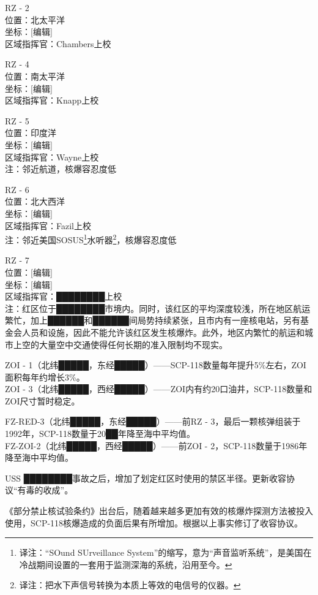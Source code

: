 RZ - 2\\
位置：北太平洋\\
坐标：{[}编辑]\\
区域指挥官：Chambers上校

RZ - 4\\
位置：南太平洋\\
坐标：{[}编辑]\\
区域指挥官：Knapp上校

RZ - 5\\
位置：印度洋\\
坐标：{[}编辑]\\
区域指挥官：Wayne上校\\
注：邻近航道，核爆容忍度低

RZ - 6\\
位置：北大西洋\\
坐标：{[}编辑]\\
区域指挥官：Fazil上校\\
注：邻近美国SOSUS\footnote{译注：“SOund SUrveillance System”的缩写，意为“声音监听系统”，是美国在冷战期间设置的一套用于监测深海的系统，沿用至今。}水听器\footnote{译注：把水下声信号转换为本质上等效的电信号的仪器。}，核爆容忍度低

RZ - 7\\
位置：{[}编辑]\\
坐标：{[}编辑]\\
区域指挥官：████████上校\\
注：红区位于████████市境内。同时，该红区的平均深度较浅，所在地区航运繁忙，加上██████和██████间局势持续紧张，且市内有一座核电站，另有基金会人员和设施，因此不能允许该红区发生核爆炸。此外，地区内繁忙的航运和城市上空的大量空中交通使得任何长期的准入限制均不现实。


ZOI - 1（北纬█████，东经█████）——SCP-118数量每年提升5\%左右，ZOI面积每年约增长3\%。\\
ZOI - 3（北纬█████，西经█████）——ZOI内有约20口油井，SCP-118数量和ZOI尺寸暂时稳定。


FZ-RED-3（北纬█████，东经█████）——前RZ - 3，最后一颗核弹组装于1992年，SCP-118数量于20██年降至海中平均值。\\
FZ-ZOI-2（北纬█████，西经█████）——前ZOI - 2，SCP-118数量于1986年降至海中平均值。

USS ████████事故之后，增加了划定红区时使用的禁区半径。更新收容协议“有毒的收成”。

《部分禁止核试验条约》出台后，随着越来越多更加有效的核爆炸探测方法被投入使用，SCP-118核爆造成的负面后果有所增加。根据以上事实修订了收容协议。

